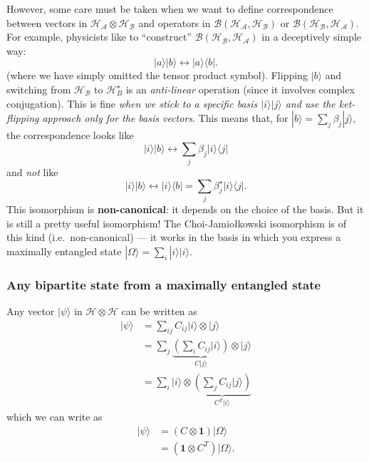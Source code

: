 \documentclass[fleqn]{article}
\begin{document}
However, some care must be taken when we want to define correspondence between vectors in \(\mathcal{H}_{\mathcal{A}}\otimes\mathcal{H}_{\mathcal{B}}\) and operators in \(\mathscr{B}(\mathcal{H}_{\mathcal{A}},\mathcal{H}_{\mathcal{B}})\) or \(\mathscr{B}(\mathcal{H}_{\mathcal{B}},\mathcal{H}_{\mathcal{A}})\).
For example, physicists like to ``construct'' \(\mathscr{B}(\mathcal{H}_{\mathcal{B}},\mathcal{H}_{\mathcal{A}})\) in a deceptively simple way:
\[
  |a\rangle|b\rangle \longleftrightarrow |a\rangle\langle b|.
\]
(where we have simply omitted the tensor product symbol).
Flipping \(|b\rangle\) and switching from \(\mathcal{H}_{\mathcal{B}}\) to \(\mathcal{H}^\star_B\) is an \emph{anti-linear} operation (since it involves complex conjugation).
This is fine \emph{when we stick to a specific basis \(|i\rangle|j\rangle\) and use the ket-flipping approach only for the basis vectors}.
This means that, for \(|b\rangle=\sum_j\beta_j|j\rangle\), the correspondence looks like
\[
  |i\rangle|b\rangle \longleftrightarrow \sum_j \beta_j |i\rangle\langle j|
\]
and \emph{not} like
\[
  |i\rangle|b\rangle \longleftrightarrow |i\rangle\langle b|
  = \sum_j \beta^\star_j |i\rangle\langle j|.
\]
This isomorphism is \textbf{non-canonical}: it depends on the choice of the basis.
But it is still a pretty useful isomorphism!
The Choi-Jamiołkowski isomorphism is of this kind (i.e.~non-canonical) --- it works in the basis in which you express a maximally entangled state \(|\Omega\rangle=\sum_i|i\rangle|i\rangle\).

\hypertarget{any-bipartite-state-from-a-maximally-entangled-state}{%
\subsubsection{Any bipartite state from a maximally entangled state}\label{any-bipartite-state-from-a-maximally-entangled-state}}

Any vector \(|\psi\rangle\) in \(\mathcal{H}\otimes\mathcal{H}\) can be written as
\[
  \begin{aligned}
    |\psi\rangle
    &= \sum_{ij} C_{ij}|i\rangle\otimes|j\rangle
  \\&= \sum_{j}\underbrace{\left(\sum_i C_{ij}|i\rangle\right)}_{C|j\rangle}\otimes|j\rangle
  \\&= \sum_{i} |i\rangle\otimes\underbrace{ \left(\sum_j C_{ij}|j\rangle\right)}_{C^T|i\rangle}
  \end{aligned}
\]
which we can write as
\[
  \begin{aligned}
    |\psi\rangle
    &= (C\otimes\mathbf{1})|\Omega\rangle
  \\&= (\mathbf{1}\otimes C^T)|\Omega\rangle.
  \end{aligned}
\]
\end{document}

